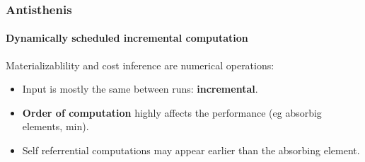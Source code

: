 \begin{frame}
  \frametitle{Antisthenis}
  \framesubtitle{Dynamically scheduled incremental computation}

  Materializablility and cost inference are numerical operations:

  \begin{itemize}
  \item Input is mostly the same between runs: \textbf{incremental}.
  \item \textbf{Order of computation} highly affects the performance
    (eg absorbig elements, min).
  \item Self referrential computations may appear earlier than the
    absorbing element.
  \end{itemize}
\end{frame}


